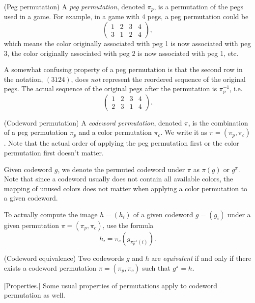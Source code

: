 \begin{definition}
(Peg permutation) A \emph{peg permutation}, denoted $\pi_p$, is a permutation of the pegs used in a game. For example, in a game with 4 pegs, a peg permutation could be
\[
\begin{pmatrix}
1 & 2 & 3 & 4 \\
3 & 1 & 2 & 4
\end{pmatrix} ,
\]
which means the color originally associated with peg 1 is now associated with peg 3, the color originally associated with peg 2 is now associated with peg 1, etc.
\end{definition}

A somewhat confusing property of a peg permutation is that the second row in the notation, $(3 1 2 4)$, does \emph{not} represent the reordered sequence of the original pegs. The actual sequence of the original pegs after the permutation is $\pi_p^{-1}$, i.e.
\[
\begin{pmatrix}
1 & 2 & 3 & 4 \\
2 & 3 & 1 & 4
\end{pmatrix} .
\]

\begin{definition}
(Codeword permutation) A \emph{codeword permutation}, denoted $\pi$, is the combination of a peg permutation $\pi_p$ and a color permutation $\pi_c$. We write it as $\pi=(\pi_p,\pi_c)$. Note that the actual order of applying the peg permutation first or the color permutation first doesn't matter.
\end{definition}

Given codeword $g$, we denote the permuted codeword under $\pi$ as $\pi(g)$ or $g^\pi$. Note that since a codeword usually does not contain all available colors, the mapping of unused colors does not matter when applying a color permutation to a given codeword.

To actually compute the image $h = (h_i)$ of a given codeword $g = (g_i)$ under a given permutation $\pi = (\pi_p, \pi_c)$, use the formula
\[
h_i = \pi_c\left(g_{\pi_p^{-1}(i)}\right) .
\]

\begin{definition}
(Codeword equivalence) Two codewords $g$ and $h$ are \emph{equivalent} if and only if there exists a codeword permutation $\pi=(\pi_p,\pi_c)$ such that $g^\pi = h$.
\end{definition}

[Properties.] Some usual properties of permutations apply to codeword permutation as well.

